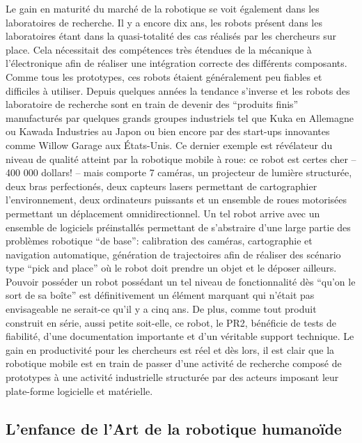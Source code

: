 Le gain en maturité du marché de la robotique se voit également dans
les laboratoires de recherche. Il y a encore dix ans, les robots
présent dans les laboratoires étant dans la quasi-totalité des cas
réalisés par les chercheurs sur place. Cela nécessitait des
compétences très étendues de la mécanique à l'électronique afin de
réaliser une intégration correcte des différents composants. Comme
tous les prototypes, ces robots étaient généralement peu fiables et
difficiles à utiliser. Depuis quelques années la tendance s'inverse et
les robots des laboratoire de recherche sont en train de devenir des
``produits finis'' manufacturés par quelques grands groupes
industriels tel que Kuka en Allemagne ou Kawada Industries au Japon ou
bien encore par des start-ups innovantes comme Willow Garage aux
États-Unis. Ce dernier exemple est révélateur du niveau de qualité
atteint par la robotique mobile à roue: ce robot est certes cher --
400 000 dollars! -- mais comporte 7 caméras, un projecteur de lumière
structurée, deux bras perfectionés, deux capteurs lasers permettant de
cartographier l'environnement, deux ordinateurs puissants et un
ensemble de roues motorisées permettant un déplacement
omnidirectionnel. Un tel robot arrive avec un ensemble de logiciels
préinstallés permettant de s'abstraire d'une large partie des
problèmes robotique ``de base'': calibration des caméras, cartographie
et navigation automatique, génération de trajectoires afin de réaliser
des scénario type ``pick and place'' où le robot doit prendre un objet
et le déposer ailleurs. Pouvoir posséder un robot possédant un tel
niveau de fonctionnalité dès ``qu'on le sort de sa boîte'' est
définitivement un élément marquant qui n'était pas envisageable ne
serait-ce qu'il y a cinq ans. De plus, comme tout produit construit en
série, aussi petite soit-elle, ce robot, le PR2, bénéficie de tests de
fiabilité, d'une documentation importante et d'un véritable support
technique. Le gain en productivité pour les chercheurs est réel et dès
lors, il est clair que la robotique mobile est en train de passer
d'une activité de recherche composé de prototypes à une activité
industrielle structurée par des acteurs imposant leur plate-forme
logicielle et matérielle.



\subsection{L'enfance de l'Art de la robotique humanoïde}


